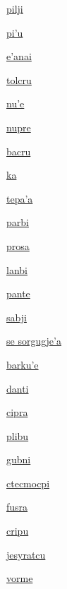 {\hyperlink{val:pilji}{pilji}}{}{}{}

{\hyperlink{val:pihu}{pi'u}}{}{}{}

{\hyperlink{val:ehanai}{e'anai}}{}{}{}

{\hyperlink{val:tolcru}{tolcru}}{}{}{}

{\hyperlink{val:nuhe}{nu'e}}{}{}{}

{\hyperlink{val:nupre}{nupre}}{}{}{}

{\hyperlink{val:bacru}{bacru}}{}{}{}

{\hyperlink{val:ka}{ka}}{}{}{}

{\hyperlink{val:tepaha}{tepa'a}}{}{}{}

{\hyperlink{val:parbi}{parbi}}{}{}{}

{\hyperlink{val:prosa}{prosa}}{}{}{}

{\hyperlink{val:lanbi}{lanbi}}{}{}{}

{\hyperlink{val:pante}{pante}}{}{}{}

{\hyperlink{val:sabji}{sabji}}{}{}{}

{\hyperlink{val:sorgugjeha}{se sorgugje'a}}{}{}{}

{\hyperlink{val:barkuhe}{barku'e}}{}{}{}

{\hyperlink{val:danti}{danti}}{}{}{}

{\hyperlink{val:cipra}{cipra}}{}{}{}

{\hyperlink{val:plibu}{plibu}}{}{}{}

{\hyperlink{val:gubni}{gubni}}{}{}{}

{\hyperlink{val:ctecmocpi}{ctecmocpi}}{}{}{}

{\hyperlink{val:fusra}{fusra}}{}{}{}

{\hyperlink{val:cripu}{cripu}}{}{}{}

{\hyperlink{val:jesyratcu}{jesyratcu}}{}{}{}

{\hyperlink{val:vorme}{vorme}}{}{}{}

